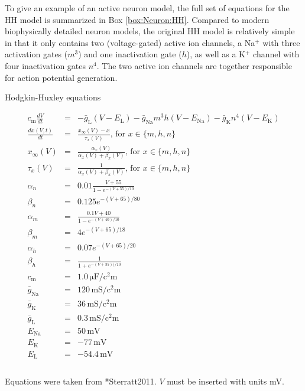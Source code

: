 To give an example of an active neuron model, the full set of equations for the HH model is summarized in Box \ref{box:Neuron:HH}. Compared to modern biophysically detailed neuron models, the original HH model is relatively simple in that it only contains two (voltage-gated) active ion channels, a Na$^+$ with three activation gates ($m^3$) and one inactivation gate ($h$), as well as a K$^+$ channel with four inactivation gates $n^4$. The two active ion channels are together responsible for action potential generation.  

\begin{floatingbox}[h]
\caption{Hodgkin-Huxley equations}
\begin{eqnarray*}
    c_{\mathrm{m}} \frac{dV}{dt} & =  & -\bar{g}_{\mathrm{L}}(V-E_{\mathrm{L}}) - \bar{g}_{\mathrm{Na}} m^3 h (V - E_{\mathrm{Na}}) - \bar{g}_{\mathrm{K}} n^4 (V - E_{\mathrm{K}}) \\
    \frac{dx(V,t)}{dt} & = & \frac{x_{\infty}(V) - x}{\tau_x(V)},  \, \text{for } x \in \{m,h,n\} \\ 
    x_{\infty}(V) &= & \frac{\alpha_x(V)}{\alpha_x(V) + \beta_x(V)}, \, \text{for } x \in \{m,h,n\} \\ %
    \tau_x(V) & = & \frac{1}{\alpha_x(V) + \beta_x(V)}, \, \text{for } x \in \{m,h,n\} \\ %
    \alpha_n &=& 0.01 \frac{V+55}{1-e^{-(V+55)/10}}  \\ %
     \beta_n &=& 0.125 e^{-(V+65)/80}   \\ %
     \alpha_m &=& \frac{0.1V+ 40}{1-e^{-(V+40)/10}}  \\   
     \beta_m &=& 4e^{-(V+65)/18}  \\ %
    \alpha_h &=& 0.07e^{-(V+65)/20}  \\ %
    \beta_h &=& \frac{1}{1+e^{-(V+35))/10}}   \\ %
    c_\mathrm{m} &=& 1.0 \,\si{\micro\farad\per\square\centi\metre} \\ %
    \bar{g}_{\mathrm{Na}} &=& 120 \,\si{\milli\siemens\per\square\centi\metre}\\ %
    \bar{g}_{\mathrm{K}} &=& 36 \,\si{\milli\siemens\per\square\centi\metre} \\ %
    \bar{g}_{\mathrm{L}} &=& 0.3 \,\si{\milli\siemens\per\square\centi\metre} \\ %
    E_{\mathrm{Na}} &=& 50 \,\si{\milli\volt} \\ %
    E_{\mathrm{K}} &=& -77  \,\si{\milli\volt} \\ %
    E_{\mathrm{L}} &=& -54.4 \,\si{\milli\volt} \\ %
\end{eqnarray*}
\\
Equations were taken from \citeasnoun**{Sterratt2011}. 
$V$ must be inserted with units \si{\milli\volt}. 
\label{box:Neuron:HH}
\end{floatingbox}

